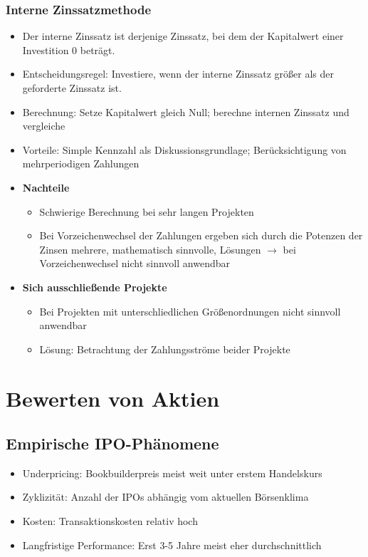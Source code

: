 \subsubsection{Interne Zinssatzmethode}
\begin{itemize}
	\item Der interne Zinssatz ist derjenige Zinssatz, bei dem der Kapitalwert einer Investition 0 beträgt.
	\item Entscheidungsregel: Investiere, wenn der interne Zinssatz größer als der geforderte Zinssatz ist.
	\item Berechnung: Setze Kapitalwert gleich Null; berechne internen Zinssatz und vergleiche
	\item Vorteile: Simple Kennzahl als Diskussionsgrundlage; Berücksichtigung von mehrperiodigen Zahlungen
	\item \textbf{Nachteile}
	\begin{itemize}
		\item Schwierige Berechnung bei sehr langen Projekten
		\item Bei Vorzeichenwechsel der Zahlungen ergeben sich durch die Potenzen der Zinsen mehrere, mathematisch sinnvolle, Lösungen \(\rightarrow\) bei Vorzeichenwechsel nicht sinnvoll anwendbar
	\end{itemize}
	\item \textbf{Sich ausschließende Projekte}
	\begin{itemize}
		\item Bei Projekten mit unterschliedlichen Größenordnungen nicht sinnvoll anwendbar
		\item Lösung: Betrachtung der Zahlungsströme beider Projekte
	\end{itemize}
\end{itemize}



\section{Bewerten von Aktien}

\subsection{Empirische IPO-Phänomene}
\begin{itemize}
	\item Underpricing: Bookbuilderpreis meist weit unter erstem Handelskurs
	\item Zyklizität: Anzahl der IPOs abhängig vom aktuellen Börsenklima
	\item Kosten: Transaktionskosten relativ hoch
	\item Langfristige Performance: Erst 3-5 Jahre meist eher durchschnittlich
\end{itemize}


